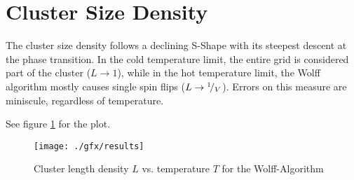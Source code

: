 \section{Cluster Size Density}
The cluster size density follows a declining S-Shape with its steepest descent at the phase transition. In the cold temperature limit, the entire grid is considered part of the cluster ($L \rightarrow 1$), while in the hot temperature limit, the Wolff algorithm mostly causes single spin flips ($L \rightarrow {}^ {1} \!/_ {V}$). Errors on this measure are miniscule, regardless of temperature.

See figure \ref{fig:evsL} for the plot.

\begin{figure}
	\texttt{[image: ./gfx/results]}
	\caption%
{Cluster length density $L$ vs. temperature $T$ for the Wolff-Algorithm}
\label{fig:evsL}
\end{figure}